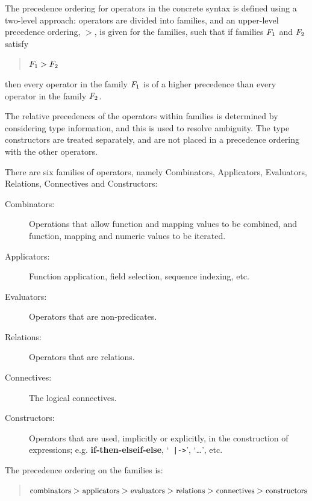 \documentclass{overturerepchap}
\newcommand{\keyw}[1]{{\bf\ttfamily #1}}
\begin{document}
The precedence ordering for operators in the concrete syntax is defined
using a two-level approach: operators are divided into families, and an
upper-level precedence ordering, $>$, is given for the families, such that
if families $F\sb{1}$ and $F\sb{2}$ satisfy

\begin{quote}
$F\sb{1} > F\sb{2}$
\end{quote}

\noindent then every operator in the family $F\sb{1}$ is of a higher precedence
than every operator in the family $F\sb{2}$.

The relative precedences of the operators within families is determined by
considering type information, and this is used to resolve ambiguity. The
type constructors are treated separately, and are not placed in a
precedence ordering with the other operators.

There are six families of operators, namely Combinators, Applicators,
Evaluators, Relations, Connectives and Constructors:

\begin{description}%
\item[Combinators:] Operations that allow function and mapping values to be
  combined, and function, mapping and numeric values to be iterated.

\item[Applicators:] Function application, field selection, sequence
  indexing, etc.

\item[Evaluators:] Operators that are non-predicates.

\item[Relations:] Operators that are relations.

\item[Connectives:] The logical connectives.

\item[Constructors:] Operators that are used, implicitly or explicitly, in
  the construction of expressions; e.g.  \keyw{if-then-elseif-else}, `{\tt
    |->}', `\ldots', etc.
\end{description}

\noindent The precedence ordering on the families is:

\begin{quote}
$\mbox{\small combinators} >
\mbox{\small applicators} >
\mbox{\small evaluators}  >
\mbox{\small relations}   >
\mbox{\small connectives} >
\mbox{\small constructors}$
\end{quote}
\end{document}
